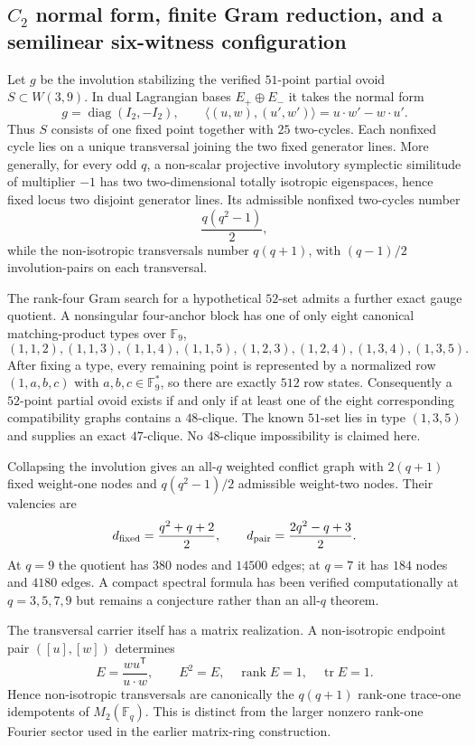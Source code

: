\subsection{$C_2$ normal form, finite Gram reduction, and a semilinear six-witness configuration}
\label{sec:pass7138-7145-c2-normalform}

Let $g$ be the involution stabilizing the verified $51$-point partial ovoid $S\subset W(3,9)$.  In dual Lagrangian bases $E_+\oplus E_-$ it takes the normal form
\[
 g=\operatorname{diag}(I_2,-I_2),\qquad
 \langle(u,w),(u',w')\rangle=u\cdot w'-w\cdot u'.
\]
Thus $S$ consists of one fixed point together with $25$ two-cycles.  Each nonfixed cycle lies on a unique transversal joining the two fixed generator lines.  More generally, for every odd $q$, a non-scalar projective involutory symplectic similitude of multiplier $-1$ has two two-dimensional totally isotropic eigenspaces, hence fixed locus two disjoint generator lines.  Its admissible nonfixed two-cycles number
\[
 \frac{q(q^2-1)}2,
\]
while the non-isotropic transversals number $q(q+1)$, with $(q-1)/2$ involution-pairs on each transversal.

The rank-four Gram search for a hypothetical $52$-set admits a further exact gauge quotient.  A nonsingular four-anchor block has one of only eight canonical matching-product types over $\mathbb F_9$,
\[
(1,1,2),(1,1,3),(1,1,4),(1,1,5),
(1,2,3),(1,2,4),(1,3,4),(1,3,5).
\]
After fixing a type, every remaining point is represented by a normalized row $(1,a,b,c)$ with $a,b,c\in\mathbb F_9^*$, so there are exactly $512$ row states.  Consequently a $52$-point partial ovoid exists if and only if at least one of the eight corresponding compatibility graphs contains a $48$-clique.  The known $51$-set lies in type $(1,3,5)$ and supplies an exact $47$-clique.  No $48$-clique impossibility is claimed here.

Collapsing the involution gives an all-$q$ weighted conflict graph with $2(q+1)$ fixed weight-one nodes and $q(q^2-1)/2$ admissible weight-two nodes.  Their valencies are
\[
 d_{\rm fixed}=\frac{q^2+q+2}{2},\qquad
 d_{\rm pair}=\frac{2q^2-q+3}{2}.
\]
At $q=9$ the quotient has $380$ nodes and $14500$ edges; at $q=7$ it has $184$ nodes and $4180$ edges.  A compact spectral formula has been verified computationally at $q=3,5,7,9$ but remains a conjecture rather than an all-$q$ theorem.

The transversal carrier itself has a matrix realization.  A non-isotropic endpoint pair $([u],[w])$ determines
\[
 E=\frac{w u^{\mathsf T}}{u\cdot w},
 \qquad E^2=E,\quad \operatorname{rank}E=1,\quad \operatorname{tr}E=1.
\]
Hence non-isotropic transversals are canonically the $q(q+1)$ rank-one trace-one idempotents of $M_2(\mathbb F_q)$.  This is distinct from the larger nonzero rank-one Fourier sector used in the earlier matrix-ring construction.

